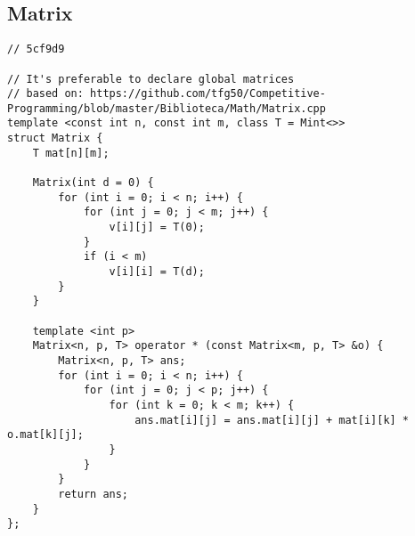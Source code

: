 \documentclass[12pt, a4paper, twoside]{article}
\begin{document}
\subsection{Matrix
}
\begin{lstlisting}
// 5cf9d9

// It's preferable to declare global matrices
// based on: https://github.com/tfg50/Competitive-Programming/blob/master/Biblioteca/Math/Matrix.cpp
template <const int n, const int m, class T = Mint<>>
struct Matrix {
	T mat[n][m];

	Matrix(int d = 0) {
		for (int i = 0; i < n; i++) {
			for (int j = 0; j < m; j++) {
				v[i][j] = T(0);
			}
			if (i < m)
				v[i][i] = T(d);
		}
	}

	template <int p>
	Matrix<n, p, T> operator * (const Matrix<m, p, T> &o) {
		Matrix<n, p, T> ans;
		for (int i = 0; i < n; i++) {
			for (int j = 0; j < p; j++) {
				for (int k = 0; k < m; k++) {
					ans.mat[i][j] = ans.mat[i][j] + mat[i][k] * o.mat[k][j];
				}
			}
		}
		return ans;
	}
};
\end{lstlisting}
\end{document}
